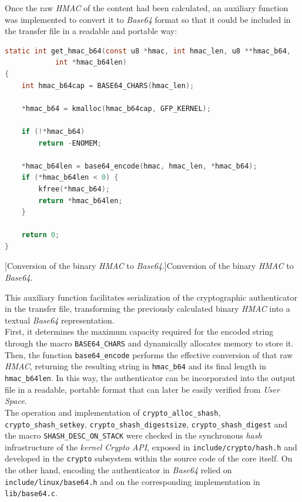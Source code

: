Once the raw \textit{HMAC} of the content had been calculated, an auxiliary function was implemented to convert it to \textit{Base64} format so that it could be included in the transfer file in a readable and portable way:

\begin{lstlisting}[language=C]
static int get_hmac_b64(const u8 *hmac, int hmac_len, u8 **hmac_b64,
			int *hmac_b64len)
{
	int hmac_b64cap = BASE64_CHARS(hmac_len);

	*hmac_b64 = kmalloc(hmac_b64cap, GFP_KERNEL);

	if (!*hmac_b64)
		return -ENOMEM;

	*hmac_b64len = base64_encode(hmac, hmac_len, *hmac_b64);
	if (*hmac_b64len < 0) {
		kfree(*hmac_b64);
		return *hmac_b64len;
	}

	return 0;
}
\end{lstlisting}
\captionsetup{type=code,justification=centering,singlelinecheck=false}
[Conversion of the binary \textit{HMAC} to \textit{Base64}.]{Conversion of the binary \textit{HMAC} to \textit{Base64}.}
\label{cod:crypto_get_hmac_b64}
\vspace{\baselineskip}

This auxiliary function facilitates serialization of the cryptographic authenticator in the transfer file, transforming the previously calculated binary \textit{HMAC} into a textual \textit{Base64} representation.\\

First, it determines the maximum capacity required for the encoded string through the macro \verb|BASE64_CHARS| and dynamically allocates memory to store it.
Then, the function \verb|base64_encode| performs the effective conversion of that raw \textit{HMAC}, returning the resulting string in \verb|hmac_b64| and its final length in \verb|hmac_b64len|.
In this way, the authenticator can be incorporated into the output file in a readable, portable format that can later be easily verified from \textit{User Space}.\\

The operation and implementation of \verb|crypto_alloc_shash|, \verb|crypto_shash_setkey|, \verb|crypto_shash_digestsize|, \verb|crypto_shash_digest| and the macro \verb|SHASH_DESC_ON_STACK| were checked in the synchronous \textit{hash} infrastructure of the \textit{kernel Crypto API}, exposed in \texttt{include/crypto/hash.h} and developed in the \texttt{crypto} subsystem within the source code of the core itself.
On the other hand, encoding the authenticator in \textit{Base64} relied on \texttt{include/linux/base64.h} and on the corresponding implementation in \texttt{lib/base64.c}.\\

